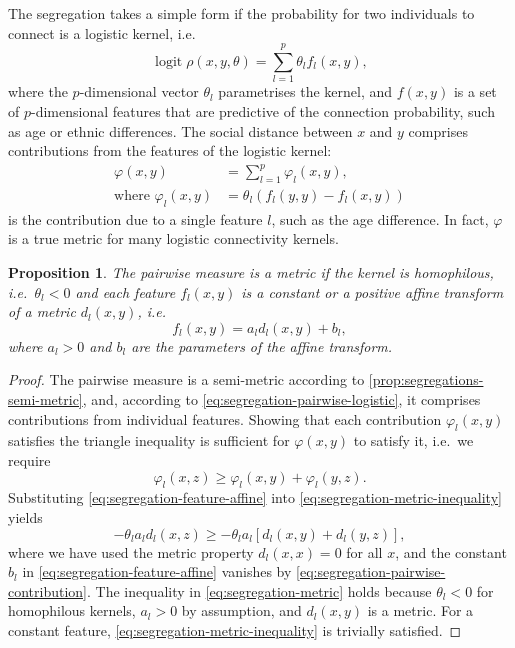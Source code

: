 \documentclass{scrartcl}
\DeclareMathOperator{\logit}{logit}
\newtheorem{prop}{Proposition}
\begin{document}
The segregation takes a simple form if the probability for two individuals to connect is a logistic kernel, i.e.\
\begin{equation}
    \logit\rho(x, y, \theta) = \sum_{l=1}^p\theta_l f_l(x,y),\label{eq:logistic-kernel}
\end{equation}
where the $p$-dimensional vector $\theta_l$ parametrises the kernel, and $f(x, y)$ is a set of $p$-dimensional features that are predictive of the connection probability, such as age or ethnic differences. The social distance between $x$ and $y$ comprises contributions from the features of the logistic kernel:
\begin{align}
    \varphi(x,y) &= \sum_{l=1}^p\varphi_l(x, y),\label{eq:segregation-pairwise-logistic}\\
    \text{where }\varphi_l(x, y) &= \theta_l\left(f_l(y, y) - f_l(x, y)\right)\label{eq:segregation-pairwise-contribution}
\end{align}
is the contribution due to a single feature $l$, such as the age difference. In fact, $\varphi$ is a true metric for many logistic connectivity kernels.

\begin{prop}
    The pairwise measure is a metric if the kernel is homophilous, i.e.\ $\theta_l<0$ and each feature $f_l(x, y)$ is a constant or a positive affine transform of a metric $d_l(x, y)$, i.e.
    \begin{equation}
        f_l(x, y) = a_l d_l(x, y) + b_l,\label{eq:segregation-feature-affine}
    \end{equation}
    where $a_l > 0$ and $b_l$ are the parameters of the affine transform.
\end{prop}
\begin{proof}
    The pairwise measure is a semi-metric according to \cref{prop:segregations-semi-metric}, and, according to \cref{eq:segregation-pairwise-logistic}, it comprises contributions from individual features. Showing that each contribution $\varphi_l(x, y)$ satisfies the triangle inequality is sufficient for $\varphi(x, y)$ to satisfy it, i.e.\ we require
    \begin{equation}
        \varphi_l(x, z) \geq \varphi_l(x, y) + \varphi_l(y, z).\label{eq:segregation-metric-inequality}
    \end{equation}
    Substituting \cref{eq:segregation-feature-affine} into \cref{eq:segregation-metric-inequality} yields
    \begin{equation}
        -\theta_l a_l d_l(x, z)\geq -\theta_l a_l\left[d_l(x, y) + d_l(y, z)\right],\label{eq:segregation-metric}
    \end{equation}
    where we have used the metric property $d_l(x, x) = 0$ for all $x$, and the constant $b_l$ in \cref{eq:segregation-feature-affine} vanishes by \cref{eq:segregation-pairwise-contribution}. The inequality in \cref{eq:segregation-metric} holds because $\theta_l<0$ for homophilous kernels, $a_l>0$ by assumption, and $d_l(x, y)$ is a metric. For a constant feature, \cref{eq:segregation-metric-inequality} is trivially satisfied.
\end{proof}
\end{document}
